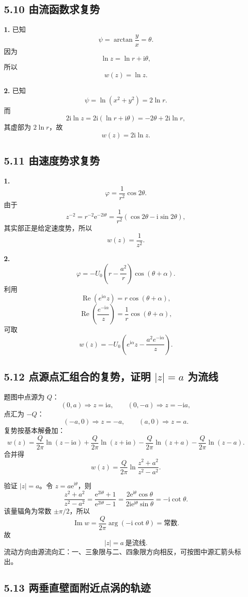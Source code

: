 ﻿\documentclass[UTF8,zihao=-4]{ctexart}
\newcommand{\ii}{\mathrm i}
\newcommand{\e}{\mathrm e}
\begin{document}
\subsection*{5.10 由流函数求复势}

\textbf{1.} 已知
\[
\psi=\arctan\frac{y}{x}=\theta .
\]
因为
\[
\ln z=\ln r+\ii\theta,
\]
所以
\[
\boxed{w(z)=\ln z.}
\]

\textbf{2.} 已知
\[
\psi=\ln(x^2+y^2)=2\ln r .
\]
而
\[
2\ii\ln z=2\ii(\ln r+\ii\theta)=-2\theta+2\ii\ln r,
\]
其虚部为 \(2\ln r\)，故
\[
\boxed{w(z)=2\ii\ln z.}
\]

\subsection*{5.11 由速度势求复势}

\textbf{1.}
\[
\varphi=\frac1{r^2}\cos2\theta .
\]
由于
\[
z^{-2}=r^{-2}\e^{-2\ii\theta}
=\frac1{r^2}(\cos2\theta-\ii\sin2\theta),
\]
其实部正是给定速度势，所以
\[
\boxed{w(z)=\frac1{z^2}.}
\]

\textbf{2.}
\[
\varphi=-U_0\left(r-\frac{a^2}{r}\right)\cos(\theta+\alpha).
\]
利用
\[
\operatorname{Re}(e^{\ii\alpha}z)=r\cos(\theta+\alpha),
\]
\[
\operatorname{Re}\left(\frac{e^{-\ii\alpha}}{z}\right)
=\frac1r\cos(\theta+\alpha),
\]
可取
\[
\boxed{
w(z)=-U_0\left(e^{\ii\alpha}z-\frac{a^2e^{-\ii\alpha}}{z}\right).}
\]

\subsection*{5.12 点源点汇组合的复势，证明 \(|z|=a\) 为流线}

题图中点源为 \(Q\)：
\[
(0,a)\Rightarrow z=\ii a,\qquad (0,-a)\Rightarrow z=-\ii a,
\]
点汇为 \(-Q\)：
\[
(-a,0)\Rightarrow z=-a,\qquad (a,0)\Rightarrow z=a .
\]
复势按基本解叠加：
\[
w(z)=\frac{Q}{2\pi}\ln(z-\ii a)
+\frac{Q}{2\pi}\ln(z+\ii a)
-\frac{Q}{2\pi}\ln(z+a)
-\frac{Q}{2\pi}\ln(z-a).
\]
合并得
\[
\boxed{
w(z)=\frac{Q}{2\pi}\ln\frac{z^2+a^2}{z^2-a^2}.}
\]

验证 \(|z|=a\)。令 \(z=a\e^{\ii\theta}\)，则
\[
\frac{z^2+a^2}{z^2-a^2}
=\frac{\e^{2\ii\theta}+1}{\e^{2\ii\theta}-1}
=\frac{2\e^{\ii\theta}\cos\theta}
{2\ii\e^{\ii\theta}\sin\theta}
=-\ii\cot\theta .
\]
该量辐角为常数 \(\pm\pi/2\)，所以
\[
\operatorname{Im}w=\frac{Q}{2\pi}\arg(-\ii\cot\theta)
=\text{常数}.
\]
故
\[
\boxed{|z|=a\ \text{是流线}.}
\]
流动方向由源流向汇：一、三象限与二、四象限方向相反，可按图中源汇箭头标出。

\subsection*{5.13 两垂直壁面附近点涡的轨迹}
\end{document}
